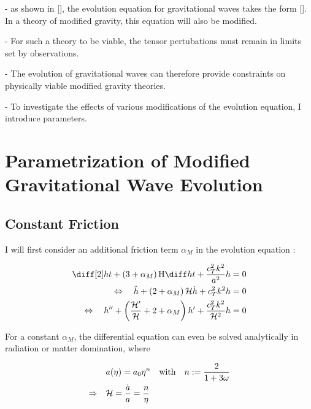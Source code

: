 \documentclass{scrreprt}
\begin{document}
- as shown in [], the evolution equation for gravitational waves takes the form []. In a theory of modified gravity, this equation will also be modified.

- For such a theory to be viable, the tensor pertubations must remain in limits set by observations.

- The evolution of gravitational waves can therefore provide constraints on physically viable modified gravity theories.

- To investigate the effects of various modifications of the evolution equation, I introduce parameters.



\chapter{Parametrization of Modified Gravitational Wave Evolution}


\section{Constant Friction}

I will first consider an additional friction term $\alpha_M$ in the evolution equation \citep{Pettorino2014}:

\begin{align}\label{eq:evolution_friction}
	\ddt{h} + \left( 3 + \alpha_M \right) \Hcosm \dt{h} + \frac{c_T^2 k^2}{a^2} h &= 0 \\
	\Leftrightarrow \quad \ddconf{h} + \left( 2 + \alpha_M \right) \Hconf \dconf{h} + c_T^2 k^2 h &= 0 \\
    \Leftrightarrow \quad \ddefold{h} + \left( \frac{\defold{\Hconf}}{\Hconf} + 2 + \alpha_M \right) \defold{h} + \frac{c_T^2 k^2}{\Hconf^2} h &= 0
\end{align}


For a constant $\alpha_M$, the differential equation can even be solved analytically in radiation or matter domination, where

\begin{align}
	&a(\eta) = a_0 \eta^n \quad \textrm{with} \quad n := \frac{2}{1+3\omega} \\
	\Rightarrow \quad &\mathcal{H} = \frac{\dot{a}}{a} = \frac{n}{\eta}
\end{align}
\end{document}
